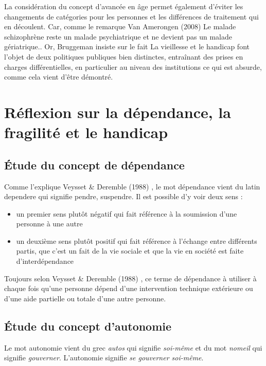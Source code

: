 La considération du concept \og d'avancée en âge\fg{} permet également d'éviter les changements de catégories pour les personnes et les différences de traitement qui en découlent. Car, comme le remarque Van Amerongen (2008) \og Le malade schizophrène reste un malade psychiatrique et ne devient pas un malade gériatrique.\fg{}. Or, Bruggeman insiste sur le fait \og La vieillesse et le handicap font l’objet de deux politiques publiques bien distinctes, entraînant des prises en charges différentielles, en particulier au niveau des institutions \fg{} ce qui est absurde, comme cela vient d'être démontré. 

\section{Réflexion sur la dépendance, la fragilité et le handicap}

\subsection{Étude du concept de dépendance}

Comme l'explique Veysset \& Deremble (1988) \cite{VeyssetDeremble1988}, le mot dépendance vient du latin \og dependere \fg{} qui signifie pendre, suspendre. Il est possible d'y voir deux sens : 
\begin{itemize}
\item un premier sens plutôt négatif qui fait référence à la soumission d'une personne à une autre
\item un deuxième sens plutôt positif qui fait référence à l'échange entre différents partis, que c'est un fait de la vie sociale et que la vie en société est faite d'interdépendance
\end{itemize}

Toujours selon Veysset \& Deremble (1988) \cite{VeyssetDeremble1988}, ce terme de dépendance à utiliser à chaque fois qu'une personne dépend d'une intervention technique extérieure ou d'une aide partielle ou totale d'une autre personne. 

\subsection{Étude du concept d'autonomie}
Le mot autonomie vient du grec \og \textit{autos}\fg{} qui signifie \og \textit{soi-même}\fg{} et du mot \og \textit{nomeil}\fg{} qui signifie \og \textit{gouverner}\fg{}. L'autonomie signifie \og \textit{se gouverner soi-même}\fg{}. 

